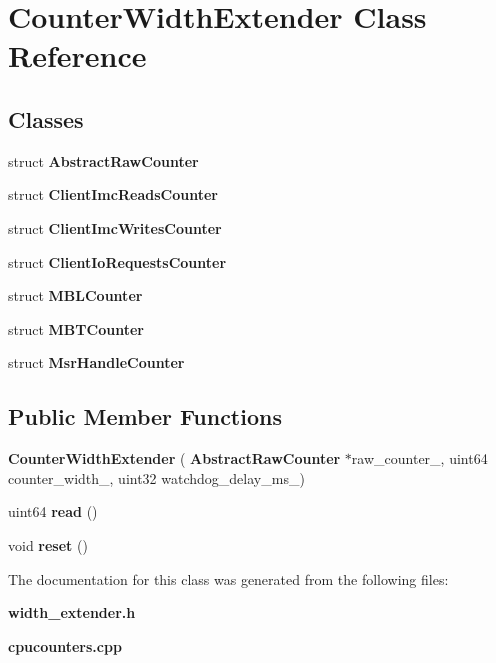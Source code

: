 \section{Counter\+Width\+Extender Class Reference}
\label{classCounterWidthExtender}
\subsection*{Classes}
\begin{DoxyCompactItemize}
\item 
struct \textbf{ Abstract\+Raw\+Counter}
\item 
struct \textbf{ Client\+Imc\+Reads\+Counter}
\item 
struct \textbf{ Client\+Imc\+Writes\+Counter}
\item 
struct \textbf{ Client\+Io\+Requests\+Counter}
\item 
struct \textbf{ M\+B\+L\+Counter}
\item 
struct \textbf{ M\+B\+T\+Counter}
\item 
struct \textbf{ Msr\+Handle\+Counter}
\end{DoxyCompactItemize}
\subsection*{Public Member Functions}
\begin{DoxyCompactItemize}
\item 
\mbox{\label{classCounterWidthExtender_a3d82385d83e31ef043103407883ee0fd}} 
{\bfseries Counter\+Width\+Extender} (\textbf{ Abstract\+Raw\+Counter} $\ast$raw\+\_\+counter\+\_\+, uint64 counter\+\_\+width\+\_\+, uint32 watchdog\+\_\+delay\+\_\+ms\+\_\+)
\item 
\mbox{\label{classCounterWidthExtender_a481ee1b6002b489711f7c8f2e17729f3}} 
uint64 {\bfseries read} ()
\item 
\mbox{\label{classCounterWidthExtender_a4b175035962a1f6b925077c3d3e02de1}} 
void {\bfseries reset} ()
\end{DoxyCompactItemize}


The documentation for this class was generated from the following files\+:\begin{DoxyCompactItemize}
\item 
\textbf{ width\+\_\+extender.\+h}\item 
\textbf{ cpucounters.\+cpp}\end{DoxyCompactItemize}

